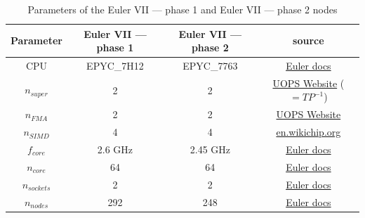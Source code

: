 \documentclass[unicode,11pt,a4paper,oneside,numbers=endperiod,openany]{scrartcl}
\begin{document}
\begin{table}
    \centering

    \begin{tabular}{|c|c|c|c|}
        \hline
        \textbf{Parameter} & \textbf{Euler VII — phase 1} & \textbf{Euler VII — phase 2} & source                                                                                                \\
        \hline
        CPU                & EPYC\_7H12                   & EPYC\_7763                   & \href{https://scicomp.ethz.ch/wiki/Euler#Euler_VII_.E2.80.94_phase_1}{Euler docs}                     \\
        \hline
        $n_{super}$        & 2                            & 2                            & \href{https://uops.info/table.html}{UOPS Website} ($=TP^{-1}$)                                        \\
        \hline
        $n_{FMA}$          & 2                            & 2                            & \href{https://uops.info/table.html}{UOPS Website}                                                     \\
        \hline
        $n_{SIMD}$         & 4                            & 4                            & \href{https://en.wikichip.org/wiki/amd/microarchitectures/zen_2#Floating_Point_Unit}{en.wikichip.org} \\
        \hline
        $f_{core}$         & 2.6 GHz                      & 2.45 GHz                     & \href{https://scicomp.ethz.ch/wiki/Euler#Euler_VII_.E2.80.94_phase_1}{Euler docs}                     \\
        \hline
        $n_{core}$         & 64                           & 64                           & \href{https://scicomp.ethz.ch/wiki/Euler#Euler_VII_.E2.80.94_phase_1}{Euler docs}                     \\
        \hline
        $n_{sockets}$      & 2                            & 2                            & \href{https://scicomp.ethz.ch/wiki/Euler#Euler_VII_.E2.80.94_phase_1}{Euler docs}                     \\
        \hline
        $n_{nodes}$        & 292                          & 248                          & \href{https://scicomp.ethz.ch/wiki/Euler#Euler_VII_.E2.80.94_phase_1}{Euler docs}                     \\
        \hline
    \end{tabular}
    \caption{Parameters of the Euler VII — phase 1 and Euler VII — phase 2 nodes}
    \label{tab:peak_performance}
\end{table}
\end{document}
